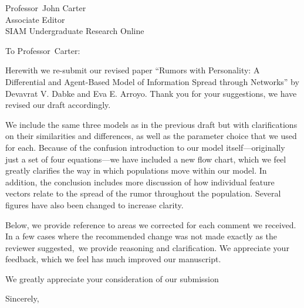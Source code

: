 \documentclass{letter}
\makeatletter
\renewcommand{\closing}[1]{\par\nobreak\vspace{\parskip}%
  \stopbreaks
  \noindent
  \ifx\@empty\fromaddress\else
  \hspace*{\longindentation}\fi
  \parbox{\indentedwidth}{\raggedright
       \ignorespaces #1\\[2\medskipamount]%
       \ifx\@empty\fromsig
           \fromname
       \else \fromsig \fi\strut}%
   \par}
\makeatother
\begin{document}
\begin{letter}{Professor\ John Carter\\
Associate Editor\\
SIAM Undergraduate Research Online\\}
\opening{To Professor\ Carter:}

Herewith we re-submit our revised paper ``Rumors with Personality: A Differential and Agent-Based Model of Information Spread through Networks'' by Devavrat V. Dabke and Eva E. Arroyo.
Thank you for your suggestions, we have revised our draft accordingly.

We include the same three models as in the previous draft but with clarifications on their similarities and differences, as well as the parameter choice that we used for each.
Because of the confusion introduction to our model itself---originally just a set of four equations---we have included a new flow chart, which we feel greatly clarifies the way in which populations move within our model.
In addition, the conclusion includes more discussion of how individual feature vectors relate to the spread of the rumor throughout the population.
Several figures have also been changed to increase clarity.

Below, we provide reference to areas we corrected for each comment we received.
In a few cases where the recommended change was not made exactly as the reviewer suggested,\ we provide reasoning and clarification.
We appreciate your feedback, which we feel has much improved our manuscript.


We greatly appreciate your consideration of our submission
\vspace{24pt}
\closing{Sincerely,}

\end{letter}
\end{document}
